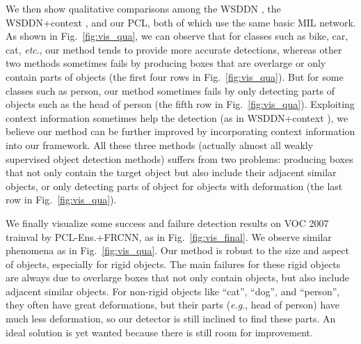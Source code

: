 \documentclass[10pt,journal,compsoc]{IEEEtran}
\def\methodname{PCL}
\def\eg{\emph{e.g}.} \def\Eg{\emph{E.g}.}
\def\etc{\emph{etc}.} \def\vs{\emph{vs}.}
\begin{document}
We then show qualitative comparisons among the WSDDN \cite{Ref:Bilen2016}, the WSDDN+context \cite{Ref:Kantorov2016}, and our \methodname\method, both of which use the same basic MIL network.
As shown in Fig.~\ref{fig:vis_qua}, we can observe that for classes such as bike, car, cat, \etc, our method tends to provide more accurate detections, whereas other two methods sometimes fails by producing boxes that are overlarge or only contain parts of objects (the first four rows in Fig.~\ref{fig:vis_qua}).
But for some classes such as person, our method sometimes fails by only detecting parts of objects such as the head of person (the fifth row in Fig.~\ref{fig:vis_qua}).
Exploiting context information sometimes help the detection (as in WSDDN+context \cite{Ref:Kantorov2016}), we believe our method can be further improved by incorporating context information into our framework.
All these three methods (actually almost all weakly supervised object detection methods) suffers from two problems:
producing boxes that not only contain the target object but also include their adjacent similar objects,
or only detecting parts of object for objects with deformation (the last row in Fig.~\ref{fig:vis_qua}).

We finally visualize some success and failure detection results on VOC 2007 trainval by \methodname-Ens.+FRCNN, as in Fig.~\ref{fig:vis_final}.
We observe similar phenomena as in Fig.~\ref{fig:vis_qua}.
Our method is robust to the size and aspect of objects, especially for rigid objects.
The main failures for these rigid objects are always due to overlarge boxes that not only contain objects, but also include adjacent similar objects.
For non-rigid objects like ``cat'', ``dog'', and ``person'', they often have great deformations,
but their parts (\eg, head of person) have much less deformation,
so our detector is still inclined to find these parts.
An ideal solution is yet wanted because there is still room for improvement.
\end{document}
